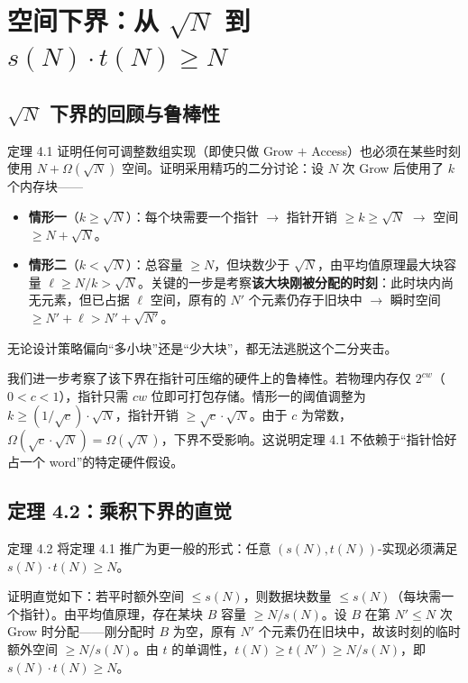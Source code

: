 \documentclass[12pt,a4paper]{ctexart}
\begin{document}
\section{空间下界：从 $\sqrt{N}$ 到 $s(N) \cdot t(N) \ge N$}

\subsection{$\sqrt{N}$ 下界的回顾与鲁棒性}

定理 4.1 证明任何可调整数组实现（即使只做 Grow $+$ Access）也必须在某些时刻使用 $N + \Omega(\sqrt{N})$ 空间。证明采用精巧的二分讨论：设 $N$ 次 Grow 后使用了 $k$ 个内存块——

\begin{itemize}[leftmargin=*]
    \item \textbf{情形一}（$k \ge \sqrt{N}$）：每个块需要一个指针 $\to$ 指针开销 $\ge k \ge \sqrt{N}$ $\to$ 空间 $\ge N + \sqrt{N}$。
    \item \textbf{情形二}（$k < \sqrt{N}$）：总容量 $\ge N$，但块数少于 $\sqrt{N}$，由平均值原理最大块容量 $\ell \ge N/k > \sqrt{N}$。关键的一步是考察\textbf{该大块刚被分配的时刻}：此时块内尚无元素，但已占据 $\ell$ 空间，原有的 $N'$ 个元素仍存于旧块中 $\to$ 瞬时空间 $\ge N' + \ell > N' + \sqrt{N'}$。
\end{itemize}

无论设计策略偏向``多小块''还是``少大块''，都无法逃脱这个二分夹击。

我们进一步考察了该下界在指针可压缩的硬件上的鲁棒性。若物理内存仅 $2^{cw}$（$0 < c < 1$），指针只需 $cw$ 位即可打包存储。情形一的阈值调整为 $k \ge (1/\sqrt{c})\cdot\sqrt{N}$，指针开销 $\ge \sqrt{c}\cdot\sqrt{N}$。由于 $c$ 为常数，$\Omega(\sqrt{c}\cdot\sqrt{N}) = \Omega(\sqrt{N})$，下界不受影响。这说明定理 4.1 不依赖于``指针恰好占一个 word''的特定硬件假设。

\subsection{定理 4.2：乘积下界的直觉}

定理 4.2 将定理 4.1 推广为更一般的形式：任意 $(s(N), t(N))$-实现必须满足 $s(N) \cdot t(N) \ge N$。

证明直觉如下：若平时额外空间 $\le s(N)$，则数据块数量 $\le s(N)$（每块需一个指针）。由平均值原理，存在某块 $B$ 容量 $\ge N/s(N)$。设 $B$ 在第 $N' \le N$ 次 Grow 时分配——刚分配时 $B$ 为空，原有 $N'$ 个元素仍在旧块中，故该时刻的临时额外空间 $\ge N/s(N)$。由 $t$ 的单调性，$t(N) \ge t(N') \ge N/s(N)$，即 $s(N) \cdot t(N) \ge N$。
\end{document}
